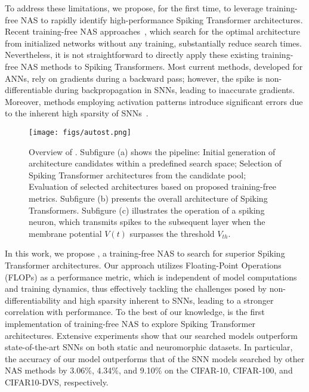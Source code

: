 \documentclass{article}
\theoremstyle{plain}
\theoremstyle{definition}
\theoremstyle{remark}
\begin{document}
To address these limitations, we propose, for the first time, to leverage training-free NAS to rapidly identify high-performance Spiking Transformer architectures. Recent training-free NAS approaches~\cite{zhouTrainingfreeTransformerArchitecture2022}, which search for the optimal architecture from initialized networks without any training, substantially reduce search times. Nevertheless, it is not straightforward to directly apply these existing training-free NAS methods to Spiking Transformers. Most current methods, developed for ANNs, rely on gradients during a backward pass; however, the spike is non-differentiable during backpropagation in SNNs, leading to inaccurate gradients. Moreover, methods employing activation patterns introduce significant errors due to the inherent high sparsity of SNNs~\cite{kimNeuralArchitectureSearch2022}.

\begin{figure*}[!t]
\begin{center}
\centerline{\texttt{[image: figs/autost.png]}}
\vspace{-0em}
\caption{Overview of \sysname. Subfigure (a) shows the \sysname pipeline:  Initial generation of architecture candidates within a predefined search space;  Selection of Spiking Transformer architectures from the candidate pool;  Evaluation of selected architectures based on proposed training-free metrics. Subfigure (b) presents the overall architecture of Spiking Transformers. Subfigure (c) illustrates the operation of a spiking neuron, which transmits spikes to the subsequent layer when the membrane potential $V(t)$ surpasses the threshold $V_{th}$.}
\label{fig: architecture}
\end{center}
\vspace{-0.35in}
\end{figure*}

In this work, we propose \sysname, a training-free NAS to search for superior Spiking Transformer architectures. Our approach utilizes Floating-Point Operations (FLOPs) as a performance metric, which is independent of model computations and training dynamics, thus effectively tackling the challenges posed by non-differentiability and high sparsity inherent to SNNs, leading to a stronger correlation with performance. To the best of our knowledge, \sysname is the first implementation of training-free NAS to explore Spiking Transformer architectures. Extensive experiments show that our searched \sysname models outperform state-of-the-art SNNs on both static and neuromorphic datasets. In particular, the accuracy of our \sysname model outperforms that of the SNN models searched by other NAS methods by 3.06\%, 4.34\%, and 9.10\% on the CIFAR-10, CIFAR-100, and CIFAR10-DVS, respectively.
\end{document}
